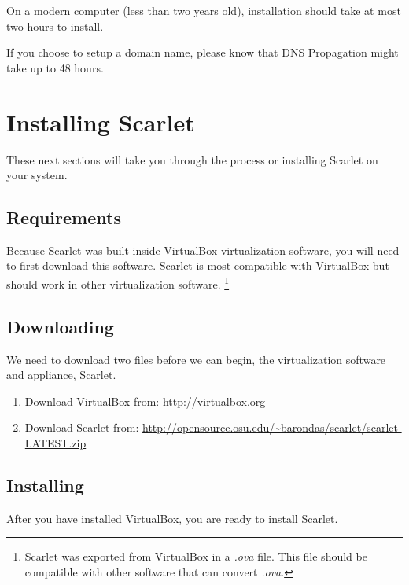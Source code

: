 \documentclass[pdftex,11pt,letterpaper]{article}
\begin{document}
On a modern computer (less than two years old), installation should take at most two hours to install.

If you choose to setup a domain name, please know that DNS Propagation might take up to 48 hours.

\section{Installing Scarlet}

These next sections will take you through the process or installing Scarlet on your system.

\subsection{Requirements}

Because Scarlet was built inside VirtualBox virtualization software, you will need to first download this software.  Scarlet is most compatible with VirtualBox but should work in other virtualization software.
\footnote{Scarlet was exported from VirtualBox in a \textit{.ova} file.  This file should be compatible with other software that can convert \textit{.ova}.}

\subsection{Downloading}

We need to download two files before we can begin, the virtualization software and appliance, Scarlet.

\begin{enumerate}
  \item Download VirtualBox from: \url{http://virtualbox.org}
  \item Download Scarlet from: \url{http://opensource.osu.edu/~barondas/scarlet/scarlet-LATEST.zip}
\end{enumerate}

\subsection{Installing}

After you have installed VirtualBox, you are ready to install Scarlet.
\end{document}
